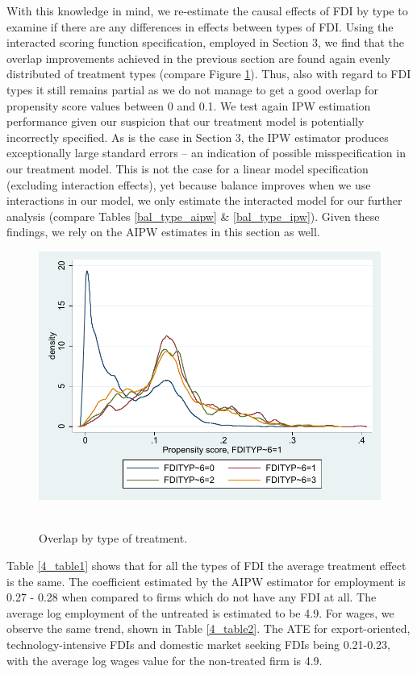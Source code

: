 With this knowledge in mind, we re-estimate the causal effects of FDI by type to examine if there are any differences in effects between types of FDI. Using the interacted scoring function specification, employed in Section 3, we find that the overlap improvements achieved in the previous section are found again evenly distributed of treatment types (compare Figure \ref{ol_aipw_type}). Thus, also with regard to FDI types it still remains partial as we do not manage to get a good overlap for propensity score values between 0 and 0.1. We test again IPW estimation performance given our suspicion that our treatment model is potentially incorrectly specified. As is the case in Section 3, the IPW estimator produces exceptionally large standard errors – an indication of possible misspecification in our treatment model. This is not the case for a linear model specification (excluding interaction effects), yet because balance improves when we use interactions in our model, we only estimate the interacted model for our further analysis (compare Tables \ref{bal_type_aipw} \& \ref{bal_type_ipw}). Given these findings, we rely on the AIPW estimates in this section as well.  

\begin{figure}
	\centering
	\includegraphics[scale=0.6]{figures_and_tables/4_overlap_aipw_typeFDI.pdf}\
	\caption{Overlap by type of treatment.}
	\label{ol_aipw_type}
\end{figure}






Table \ref{4_table1} shows that for all the types of FDI the average treatment effect is the same. The coefficient estimated by the AIPW estimator for employment is 0.27 - 0.28 when compared to firms which do not have any FDI at all. The average log employment of the untreated is estimated to be 4.9. For wages, we observe the same trend, shown in Table \ref{4_table2}. The ATE for export-oriented, technology-intensive FDIs and domestic market seeking FDIs being 0.21-0.23, with the average log wages value for the non-treated firm is 4.9. 

